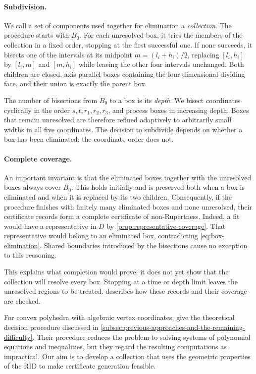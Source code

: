 \paragraph{Subdivision.}
We call a set of components used together for elimination a \emph{collection}.
The procedure starts with $B_0$. For each unresolved box, it tries the
members of the collection in a fixed order, stopping at the first successful one. If none
succeeds, it bisects one of the intervals at its midpoint
$m=(l_i+h_i)/2$, replacing $[l_i,h_i]$ by $[l_i,m]$ and $[m,h_i]$ while
leaving the other four intervals unchanged. Both children are closed,
axis-parallel boxes containing the four-dimensional dividing face, and
their union is exactly the parent box.

The number of bisections from $B_0$ to a box is its \emph{depth}. We bisect
coordinates cyclically in the order $s,t,r_1,r_2,r_3$, and process boxes in
increasing depth. Boxes that remain unresolved are therefore refined adaptively
to arbitrarily small widths in all five coordinates. The decision to subdivide depends on
whether a box has been eliminated; the coordinate order does not.

\paragraph{Complete coverage.}
An important invariant is that the eliminated boxes together with the unresolved
boxes always cover $B_0$. This holds initially and is preserved both when a box is
eliminated and when it is replaced by its two children. Consequently, if
the procedure finishes with finitely many eliminated boxes and none
unresolved, their certificate records form a complete certificate of
non-Rupertness. Indeed, a fit would have a representative in $D$
by \cref{prop:representative-coverage}. That representative would belong
to an eliminated box, contradicting \cref{eq:box-elimination}. Shared
boundaries introduced by the bisections cause no exception to this reasoning.

This explains what completion would prove; it does not yet show that the
collection will resolve every box. Stopping at a time or depth limit leaves
the unresolved regions to be treated. 
describes how these records and their coverage are checked.

For convex polyhedra with algebraic vertex coordinates,
\citet{SteiningerYurkevich2023} give the theoretical decision procedure
discussed in \cref{subsec:previous-approaches-and-the-remaining-difficulty}.
Their procedure reduces
the problem to solving systems of polynomial equations and inequalities,
but they regard the resulting computations as impractical. Our aim is to
develop a collection that uses the geometric properties of the RID
to make certificate generation feasible.

